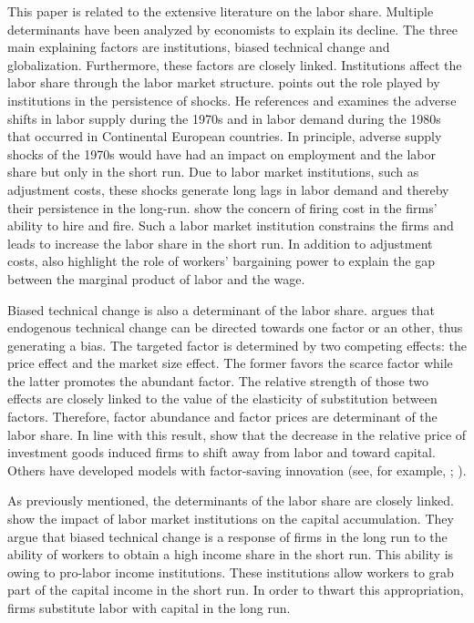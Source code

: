 This paper is related to the extensive literature on the labor share. Multiple determinants have been analyzed by economists to explain its decline. The three main explaining factors are institutions, biased technical change and globalization. Furthermore, these factors are closely linked.
Institutions affect the labor share through the labor market structure. \cite{Blanchard1997} points out the role played by institutions in the persistence of shocks. He references and examines the adverse shifts in labor supply during the 1970s and in labor demand during the 1980s that occurred in Continental European countries. In principle, adverse supply shocks of the 1970s would have had an impact on employment and the labor share but only in the short run. Due to labor market institutions, such as adjustment costs, these shocks generate long lags in labor demand and thereby their persistence in the long-run. \cite{Bentolila1990} show the concern of firing cost in the firms' ability to hire and fire. Such a labor market institution constrains the firms and leads to increase the labor share in the short run. In addition to adjustment costs, \cite{Bentolila2003} also highlight the role of workers' bargaining power to explain the gap between the marginal product of labor and the wage.

Biased technical change is also a determinant of the labor share. \cite{Acemoglu2002} argues that endogenous technical change can be directed towards one factor or an other, thus generating a bias. The targeted factor is determined by two competing effects: the price effect and the market size effect. The former favors the scarce factor while the latter promotes the abundant factor. The relative strength of those two effects are closely linked to the value of the elasticity of substitution between factors. Therefore, factor abundance and factor prices are determinant of the labor share. In line with this result, \cite{Karabarbounis2014} show that the decrease in the relative price of investment goods induced firms to shift away from labor and toward capital. Others have developed models with factor-saving innovation (see, for example, \citealt{Zuleta2008}; \citealt{Peretto2013}).

As previously mentioned, the determinants of the labor share are closely linked. \cite{Caballero1998} show the impact of labor market institutions on the capital accumulation. They argue that biased technical change is a response of firms in the long run to the ability of workers to obtain a high income share in the short run. This ability is owing to pro-labor income institutions. These institutions allow workers to grab part of the capital income in the short run. In order to thwart this appropriation, firms substitute labor with capital in the long run.

